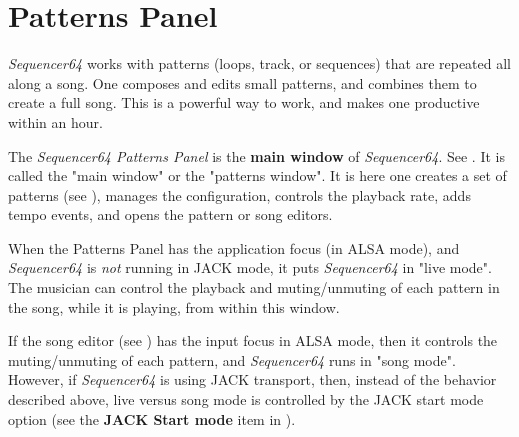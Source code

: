 %
%
%

\section{Patterns Panel}
\label{sec:seq64_patterns_panel}

   \textsl{Sequencer64} works with patterns (loops, track, or
   sequences) that are repeated all along a song.  One composes and edits small
   patterns, and combines them to create a full song.  This is a powerful way
   to work, and makes one productive within an hour.

   The \textsl{Sequencer64 Patterns Panel} is the
   \textbf{main window} of \textsl{Sequencer64}.
   See .
   It is called the "main window" or the "patterns window".
   It is here one creates a set of patterns
   (see ),
   manages the configuration, controls the playback rate, adds tempo events,
   and opens the pattern or song editors.

   When the Patterns Panel has the application focus (in ALSA mode),
   and \textsl{Sequencer64}
   is \textsl{not} running in JACK mode, it puts
   \textsl{Sequencer64} in "live mode".  The musician can
   control the playback and muting/unmuting of each pattern in
   the song, while it is playing, from within this window.

   If the song editor
   (see )
   has the input focus in ALSA mode, then it controls the muting/unmuting of
   each pattern, and \textsl{Sequencer64} runs in "song mode".
   However, if \textsl{Sequencer64} is using JACK transport, then, instead of
   the behavior described above, live versus song mode is controlled by the
   JACK start mode option (see the \textbf{JACK Start mode} item in
   ).

